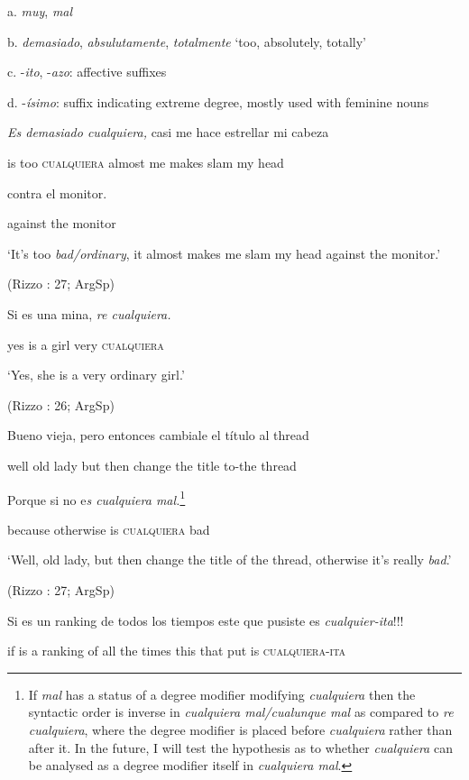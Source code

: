   a. \textit{muy}, \textit{mal} 

  b. \textit{demasiado}, \textit{absulutamente}, \textit{totalmente} ‘too, absolutely, totally’

  c. -\textit{ito}, -\textit{azo}: affective suffixes 

  d. -\textit{ísimo}: suffix indicating extreme degree, mostly used with feminine nouns

  \textit{Es  demasiado  cualquiera,}  casi  me  hace  estrellar  mi  cabeza

  is  too  \textsc{cualquiera}  almost me makes slam  my  head

  contra  el  monitor.            

  against  the  monitor            

  ‘It’s too \textit{bad/ordinary}, it almost makes me slam my head against the monitor.’

  (Rizzo \citealt{Salierno2013}: 27; ArgSp)

  Si  es  una  mina,  \textit{re  cualquiera.}

  yes  is  a  girl  very  \textsc{cualquiera}

  ‘Yes, she is a very ordinary girl.’

  (Rizzo \citealt{Salierno2013}: 26; ArgSp)

  Bueno   vieja,  pero  entonces  cambiale  el  título  al  thread

  well  old lady  but  then  change  the  title  to-the  thread

  Porque  si  no  e\textit{s  cualquiera  mal.}\footnote{{If} {\textit{mal}} {has a status of a degree modifier modifying} {\textit{cualquiera}} {then the syntactic order is inverse in} {\textit{cualquiera mal/cualunque mal}} {as compared to} {\textit{re cualquiera}}{, where the degree modifier is placed before} {\textit{cualquiera}} {rather than after it. In the future, I will test the hypothesis as to whether} {\textit{cualquiera}} {can be analysed as a degree modifier itself in} {\textit{cualquiera mal}}. }

  because  otherwise  is  \textsc{cualquiera} bad

  ‘Well, old lady, but then change the title of the thread, otherwise it’s really \textit{bad}.’

  (Rizzo \citealt{Salierno2013}: 27; ArgSp)

  Si  es  un  ranking  de  todos  los  tiempos  este  que  pusiste  es  \textit{cualquier-ita}!!!

  if  is  a  ranking  of  all  the  times  this  that  put  is  \textsc{cualquiera-ita}

